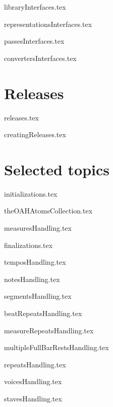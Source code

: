 \documentclass[11pt,a4paper]{report}
\begin{document}
{libraryInterfaces.tex}

{representationsInterfaces.tex}

{passesInterfaces.tex}

{convertersInterfaces.tex}


\part{Releases}

{releases.tex}

{creatingReleases.tex}


\part{Selected topics}


{initializations.tex}



{theOAHAtomsCollection.tex}



{measuresHandling.tex}

{finalizations.tex}

{temposHandling.tex}

{notesHandling.tex}

{segmentsHandling.tex}

{beatRepeatsHandling.tex}

{measureRepeatsHandling.tex}

{multipleFullBarRestsHandling.tex}

{repeatsHandling.tex}

{voicesHandling.tex}

{stavesHandling.tex}
\end{document}
